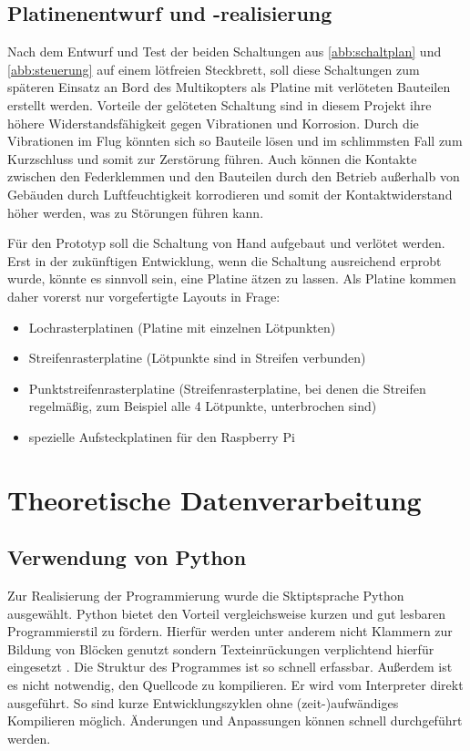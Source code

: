 \documentclass[a4paper,12pt,bibliography=totoc, listof=totoc,titlepage,pointlessnumbers]{scrreprt}
\begin{document}
\section{Platinenentwurf und -realisierung}
Nach dem Entwurf und Test der beiden Schaltungen aus \autoref{abb:schaltplan} und \autoref{abb:steuerung} auf einem lötfreien Steckbrett, soll diese Schaltungen zum späteren Einsatz an Bord des Multikopters als Platine mit verlöteten Bauteilen erstellt werden. Vorteile der gelöteten Schaltung sind in diesem Projekt ihre höhere Widerstandsfähigkeit gegen Vibrationen und Korrosion. Durch die Vibrationen im Flug könnten sich so Bauteile lösen und im schlimmsten Fall zum Kurzschluss und somit zur Zerstörung führen. Auch können die Kontakte zwischen den Federklemmen und den Bauteilen durch den Betrieb außerhalb von Gebäuden durch Luftfeuchtigkeit korrodieren und somit der Kontaktwiderstand höher werden, was zu Störungen führen kann.

Für den Prototyp soll die Schaltung von Hand aufgebaut und verlötet werden. Erst in der zukünftigen Entwicklung, wenn die Schaltung ausreichend erprobt wurde, könnte es sinnvoll sein, eine Platine ätzen zu lassen. Als Platine kommen daher vorerst nur vorgefertigte Layouts in Frage:

\begin{itemize}
 \item Lochrasterplatinen (Platine mit einzelnen Lötpunkten)
 \item Streifenrasterplatine (Lötpunkte sind in Streifen verbunden)
 \item Punktstreifenrasterplatine (Streifenrasterplatine, bei denen die Streifen regelmäßig, zum Beispiel alle 4 Lötpunkte, unterbrochen sind)
 \item spezielle Aufsteckplatinen für den Raspberry Pi
\end{itemize}


\chapter{Theoretische Datenverarbeitung}
\label{c:datenverarbeitung}

\section{Verwendung von Python}
Zur Realisierung der Programmierung wurde die Sktiptsprache Python ausgewählt. Python bietet den Vorteil vergleichsweise kurzen und gut lesbaren Programmierstil zu fördern. Hierfür werden unter anderem nicht Klammern zur Bildung von Blöcken genutzt sondern Texteinrückungen verplichtend hierfür eingesetzt \citep[S. 13f]{python}. Die Struktur des Programmes ist so schnell erfassbar. Außerdem ist es nicht notwendig, den Quellcode zu kompilieren. Er wird vom Interpreter direkt ausgeführt. So sind kurze Entwicklungszyklen ohne (zeit-)aufwändiges Kompilieren möglich. Änderungen und Anpassungen können schnell durchgeführt werden.
\end{document}
